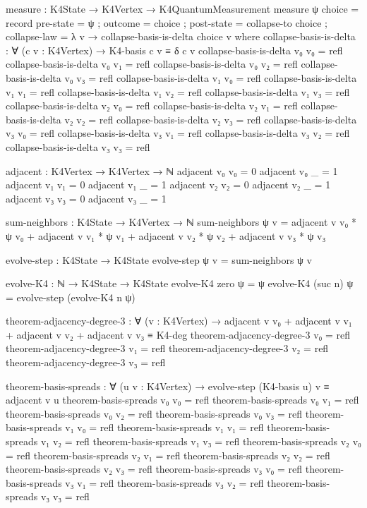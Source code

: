\documentclass[11pt,a4paper]{book}
\begin{document}
\begin{code}
measure : K4State → K4Vertex → K4QuantumMeasurement
measure ψ choice = record
  { pre-state    = ψ
  ; outcome      = choice
  ; post-state   = collapse-to choice
  ; collapse-law = λ v → collapse-basis-is-delta choice v
  }
  where
    collapse-basis-is-delta : ∀ (c v : K4Vertex) → K4-basis c v ≡ δ c v
    collapse-basis-is-delta v₀ v₀ = refl
    collapse-basis-is-delta v₀ v₁ = refl
    collapse-basis-is-delta v₀ v₂ = refl
    collapse-basis-is-delta v₀ v₃ = refl
    collapse-basis-is-delta v₁ v₀ = refl
    collapse-basis-is-delta v₁ v₁ = refl
    collapse-basis-is-delta v₁ v₂ = refl
    collapse-basis-is-delta v₁ v₃ = refl
    collapse-basis-is-delta v₂ v₀ = refl
    collapse-basis-is-delta v₂ v₁ = refl
    collapse-basis-is-delta v₂ v₂ = refl
    collapse-basis-is-delta v₂ v₃ = refl
    collapse-basis-is-delta v₃ v₀ = refl
    collapse-basis-is-delta v₃ v₁ = refl
    collapse-basis-is-delta v₃ v₂ = refl
    collapse-basis-is-delta v₃ v₃ = refl

adjacent : K4Vertex → K4Vertex → ℕ
adjacent v₀ v₀ = 0
adjacent v₀ _  = 1
adjacent v₁ v₁ = 0
adjacent v₁ _  = 1
adjacent v₂ v₂ = 0
adjacent v₂ _  = 1
adjacent v₃ v₃ = 0
adjacent v₃ _  = 1

sum-neighbors : K4State → K4Vertex → ℕ
sum-neighbors ψ v = adjacent v v₀ * ψ v₀ + adjacent v v₁ * ψ v₁
                  + adjacent v v₂ * ψ v₂ + adjacent v v₃ * ψ v₃

evolve-step : K4State → K4State
evolve-step ψ v = sum-neighbors ψ v

evolve-K4 : ℕ → K4State → K4State
evolve-K4 zero ψ = ψ
evolve-K4 (suc n) ψ = evolve-step (evolve-K4 n ψ)

theorem-adjacency-degree-3 : ∀ (v : K4Vertex) →
  adjacent v v₀ + adjacent v v₁ + adjacent v v₂ + adjacent v v₃ ≡ K4-deg
theorem-adjacency-degree-3 v₀ = refl
theorem-adjacency-degree-3 v₁ = refl
theorem-adjacency-degree-3 v₂ = refl
theorem-adjacency-degree-3 v₃ = refl

theorem-basis-spreads : ∀ (u v : K4Vertex) →
  evolve-step (K4-basis u) v ≡ adjacent v u
theorem-basis-spreads v₀ v₀ = refl
theorem-basis-spreads v₀ v₁ = refl
theorem-basis-spreads v₀ v₂ = refl
theorem-basis-spreads v₀ v₃ = refl
theorem-basis-spreads v₁ v₀ = refl
theorem-basis-spreads v₁ v₁ = refl
theorem-basis-spreads v₁ v₂ = refl
theorem-basis-spreads v₁ v₃ = refl
theorem-basis-spreads v₂ v₀ = refl
theorem-basis-spreads v₂ v₁ = refl
theorem-basis-spreads v₂ v₂ = refl
theorem-basis-spreads v₂ v₃ = refl
theorem-basis-spreads v₃ v₀ = refl
theorem-basis-spreads v₃ v₁ = refl
theorem-basis-spreads v₃ v₂ = refl
theorem-basis-spreads v₃ v₃ = refl


\end{code}
\end{document}
